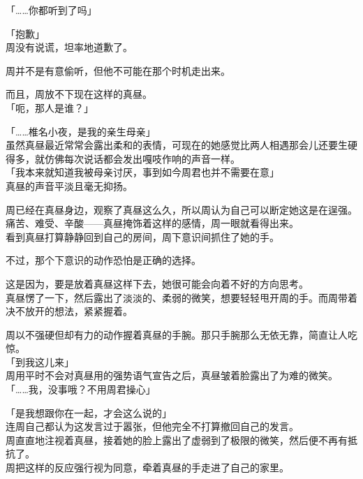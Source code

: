 「……你都听到了吗」

「抱歉」\\

周没有说谎，坦率地道歉了。

周并不是有意偷听，但他不可能在那个时机走出来。

而且，周放不下现在这样的真昼。\\

「呃，那人是谁？」

「……椎名小夜，是我的亲生母亲」\\

虽然真昼最近常常会露出柔和的表情，可现在的她感觉比两人相遇那会儿还要生硬得多，就仿佛每次说话都会发出嘎吱作响的声音一样。\\

「我本来就知道我被母亲讨厌，事到如今周君也并不需要在意」\\%

真昼的声音平淡且毫无抑扬。

周已经在真昼身边，观察了真昼这么久，所以周认为自己可以断定她这是在逞强。\\

痛苦、难受、辛酸——真昼掩饰着这样的感情，周一眼就看得出来。\\

看到真昼打算静静回到自己的房间，周下意识间抓住了她的手。

不过，那个下意识的动作恐怕是正确的选择。

这是因为，要是放着真昼这样下去，她很可能会向着不好的方向思考。\\%

真昼愣了一下，然后露出了淡淡的、柔弱的微笑，想要轻轻甩开周的手。而周带着决不放开的想法，紧紧握着。

周以不强硬但却有力的动作握着真昼的手腕。那只手腕那么无依无靠，简直让人吃惊。\\

「到我这儿来」\\

周用平时不会对真昼用的强势语气宣告之后，真昼皱着脸露出了为难的微笑。\\

「……我，没事哦？不用周君操心」

「是我想跟你在一起，才会这么说的」\\

连周自己都认为这发言过于嚣张，但他完全不打算撤回自己的发言。\\

周直直地注视着真昼，接着她的脸上露出了虚弱到了极限的微笑，然后便不再有抵抗了。\\

周把这样的反应强行视为同意，牵着真昼的手走进了自己的家里。
